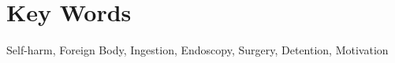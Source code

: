 \section*{Key Words}
\noindent Self-harm, Foreign Body, Ingestion, Endoscopy, Surgery, Detention, Motivation
